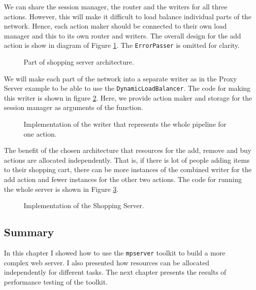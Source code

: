 We can share the session manager, the router and the writers for all three actions. 
However, this will make it difficult to load balance individual parts
of the network. Hence, each action maker should be connected to their
own load manager and this to its own router and writers. The overall 
design for the add action
is show in diagram of Figure \ref{fig:shoppingDesign}. The \texttt{ErrorPasser} 
is omitted for clarity.
\begin{figure}[h]
\centering
{}
\caption[scale=1.0]{Part of shopping server architecture.}
\label{fig:shoppingDesign}
\end{figure}

We will make each part of the network into a separate writer as in
the Proxy Server example to be able to use the \texttt{DynamicLoadBalancer}.
The code for making this writer is shown in figure \ref{fig:shoppingWriter}.
Here, we provide action maker and storage for the session manager 
as arguments of the function.

\newpage
\begin{figure}[h]
 
\caption[scale=1.0]{Implementation of the writer that represents the whole
pipeline for one action.}
\label{fig:shoppingWriter}
\end{figure}

The benefit of the chosen architecture that resources for the add, remove
and buy actions are allocated independently. That is, if there is lot of 
people adding items to their shopping cart, there can be more instances
of the combined writer for the add action and fewer instances for the
other two actions. The code for running the whole server is shown
in Figure \ref{fig:ShoppingCode}.
\begin{figure}[h]
 
\caption[scale=1.0]{Implementation of the Shopping Server.}
\label{fig:ShoppingCode}
\end{figure}

\subsection{Summary}
In this chapter I showed how to use the \texttt{mpserver} toolkit
to build a more complex web server. I also presented how resources can
be allocated independently for different tasks. The next chapter 
presents the results of performance testing of the toolkit.


